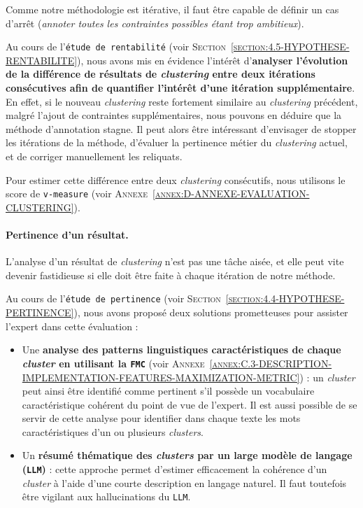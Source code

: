 			Comme notre méthodologie est itérative, il faut être capable de définir un cas d'arrêt (\textit{annoter toutes les contraintes possibles étant trop ambitieux}).
			
			Au cours de l'\texttt{étude de rentabilité} (voir \textsc{Section~\ref{section:4.5-HYPOTHESE-RENTABILITE}}), nous avons mis en évidence l'intérêt d'\textbf{analyser l'évolution de la différence de résultats de \textit{clustering} entre deux itérations consécutives afin de quantifier l'intérêt d'une itération supplémentaire}.
			En effet, si le nouveau \textit{clustering} reste fortement similaire au \textit{clustering} précédent, malgré l'ajout de contraintes supplémentaires, nous pouvons en déduire que la méthode d'annotation stagne.
			Il peut alors être intéressant d'envisager de stopper les itérations de la méthode, d'évaluer la pertinence métier du \textit{clustering} actuel, et de corriger manuellement les reliquats.
			
			Pour estimer cette différence entre deux \textit{clustering} consécutifs, nous utilisons le score de \texttt{v-measure} (voir \textsc{Annexe~\ref{annex:D-ANNEXE-EVALUATION-CLUSTERING}}).
		
		
		\paragraph{\textcolor{colorSilverLakeBlue}{\faCheckSquare} Pertinence d'un résultat.}
			
			L'analyse d'un résultat de \textit{clustering} n'est pas une tâche aisée, et elle peut vite devenir fastidieuse si elle doit être faite à chaque itération de notre méthode.
			
			Au cours de l'\texttt{étude de pertinence} (voir \textsc{Section~\ref{section:4.4-HYPOTHESE-PERTINENCE}}), nous avons proposé deux solutions prometteuses pour assister l'expert dans cette évaluation :
			\begin{itemize}
				\item Une \textbf{analyse des patterns linguistiques caractéristiques de chaque \textit{cluster} en utilisant la \texttt{FMC}} (voir \textsc{Annexe~\ref{annex:C.3-DESCRIPTION-IMPLEMENTATION-FEATURES-MAXIMIZATION-METRIC}}) :
				un \textit{cluster} peut ainsi être identifié comme pertinent s'il possède un vocabulaire caractéristique cohérent du point de vue de l'expert.
				Il est aussi possible de se servir de cette analyse pour identifier dans chaque texte les mots caractéristiques d'un ou plusieurs \textit{clusters}.
				\item Un \textbf{résumé thématique des \textit{clusters} par un large modèle de langage (\texttt{LLM})} :
				cette approche permet d'estimer efficacement la cohérence d'un \textit{cluster} à l'aide d'une courte description en langage naturel.
				Il faut toutefois être vigilant aux hallucinations du \texttt{LLM}.
			\end{itemize}
			
